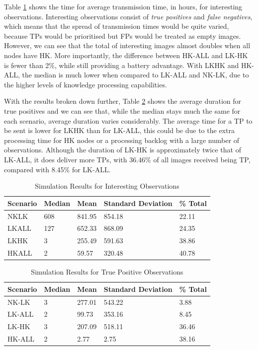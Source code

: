 Table \ref{tab:observ_int} shows the time for average transmission time, in hours, for interesting observations. Interesting observations consist of \textit{true positives} and \textit{false negatives}, which means that the spread of transmission times would be quite varied, because TPs would be prioritised but FPs would be treated as empty images. However, we can see that the total of interesting images almost doubles when all nodes have HK. More importantly, the difference between HK-ALL and LK-HK is fewer than 2\%, while still providing a battery advantage. With LKHK and HK-ALL, the median is much lower when compared to LK-ALL and NK-LK, due to the higher levels of knowledge processing capabilities.

With the results broken down further, Table \ref{tab:observ_tp} shows the average duration for true positives and we can see that, while the median stays much the same for each scenario, average duration varies considerably. The average time for a TP to be sent is lower for LKHK than for LK-ALL, this could be due to the extra processing time for HK nodes or a processing backlog with a large number of observations. Although the duration of LK-HK is approximately twice that of LK-ALL, it does deliver more TPs, with 36.46\% of all images received being TP, compared with 8.45\% for LK-ALL.

\begin{table}[h]\footnotesize
\begin{tabularx}{\textwidth}{ |X|X|X|X|X|}
\hline
Scenario & Median & Mean & Standard Deviation & \% Total\\
\hline
NKLK & 608 & 841.95 & 854.18 & 22.11\\
LKALL & 127 & 652.33 & 868.09 & 24.35\\
LKHK & 3 & 255.49 & 591.63 & 38.86\\
HKALL & 2 & 59.57 & 320.48 & 40.78\\
\hline
\end{tabularx}
\caption{Simulation Results for Interesting Observations}\label{tab:observ_int}
\end{table}

\begin{table}[h]\footnotesize
\begin{tabularx}{\textwidth}{ |X|X|X|X|X|}
\hline
Scenario & Median & Mean & Standard Deviation & \% Total\\
\hline
NK-LK & 3 & 277.01 & 543.22 & 3.88\\
LK-ALL & 2 & 99.73 & 353.16 & 8.45\\
LK-HK & 3 & 207.09 & 518.11 & 36.46\\
HK-ALL & 2 & 2.77 & 2.75 & 38.16\\
\hline
\end{tabularx}
\caption{Simulation Results for True Positive Observations}\label{tab:observ_tp}
\end{table}

